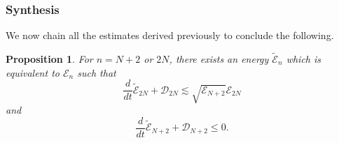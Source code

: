 \documentclass[a4paper,reqno,11pt]{amsart}
\numberwithin{equation}{section}
\providecommand{\se}[1]{\mathcal{E}_{#1}}
\newtheorem{prop}[lem]{Proposition}
\begin{document}
\subsubsection{Synthesis}

We now chain all the estimates derived previously to conclude the following.
\begin{prop}
For $n=N+2$ or $2N$, there exists an energy $\tilde{ \mathcal{E}}_{n}$ which is equivalent to $\mathcal{E}_{n}$ such that
\begin{equation}\label{sys2nc}
\frac{d}{dt}\tilde{ \mathcal{E}}_{2N}+ {\mathcal{D}}_{2N}  {\lesssim}     \sqrt{ \se{N+2}  }{\mathcal{E}}_{2N}
\end{equation}
and
\begin{equation}\label{sysn+2c}
\frac{d}{dt}\tilde{ \mathcal{E}}_{N+2}+ {\mathcal{D}}_{N+2}  \le 0.
\end{equation}
\end{prop}
\end{document}
